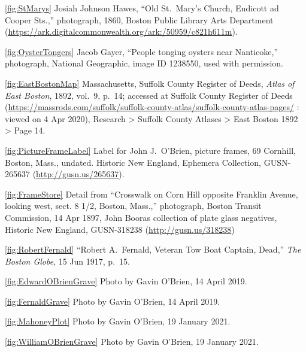 \ref{fig:StMarys} Josiah Johnson Hawes, ``Old St.\ Mary's Church, Endicott ad Cooper Sts.,'' photograph, 1860, Boston Public Library Arts Department (\url{https://ark.digitalcommonwealth.org/ark:/50959/c821h611m}).

\ref{fig:OysterTongers} Jacob Gayer, ``People tonging oysters near Nanticoke,'' photograph, National Geographic, image ID 1238550, used with permission.

\ref{fig:EastBostonMap} Massachusetts, Suffolk County Register of Deeds, \textit{Atlas of East Boston}, 1892, vol.\ 9, p.\ 14; accessed at Suffolk County Register of Deeds (\url{https://massrods.com/suffolk/suffolk-county-atlas/suffolk-county-atlas-pages/} : viewed on 4 Apr 2020), Research > Suffolk County Atlases > East Boston 1892 > Page 14.

\ref{fig:PictureFrameLabel} Label for John J.\ O'Brien, picture frames, 69 Cornhill, Boston, Mass., undated. Historic New England, Ephemera Collection, GUSN-265637 (\url{http://gusn.us/265637}).

\ref{fig:FrameStore} Detail from ``Crosswalk on Corn Hill opposite Franklin Avenue, looking west, sect. 8 1/2, Boston, Mass.,'' photograph, Boston Transit Commission, 14 Apr 1897, John Booras collection of plate glass negatives, Historic New England, GUSN-318238 (\url{http://gusn.us/318238}) 

\ref{fig:RobertFernald} ``Robert A.\ Fernald, Veteran Tow Boat Captain, Dead,'' \textit{The Boston Globe}, 15 Jun 1917, p.\ 15.

\ref{fig:EdwardOBrienGrave} Photo by Gavin O'Brien, 14 April 2019.

\ref{fig:FernaldGrave} Photo by Gavin O'Brien, 14 April 2019.

\ref{fig:MahoneyPlot} Photo by Gavin O'Brien, 19 January 2021.

\ref{fig:WilliamOBrienGrave} Photo by Gavin O'Brien, 19 January 2021.